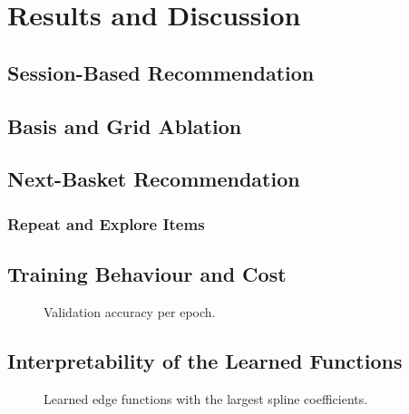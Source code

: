 \chapter{Results and Discussion}
\label{ch:results}

\section{Session-Based Recommendation}



\section{Basis and Grid Ablation}


\section{Next-Basket Recommendation}



\subsection{Repeat and Explore Items}





\section{Training Behaviour and Cost}

\begin{figure}[H]
\centering
{}
\caption{Validation accuracy per epoch.}
\label{fig:curves}
\end{figure}


\section{Interpretability of the Learned Functions}
\label{sec:interp}

\begin{figure}[H]
\centering
{}
\caption{Learned edge functions with the largest spline coefficients.}
\label{fig:edges}
\end{figure}
